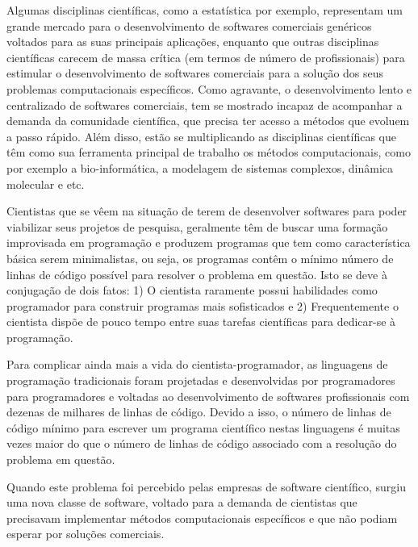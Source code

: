 \documentclass[a4paper,10pt,portuguese]{sphinxmanual}
\begin{document}
Algumas disciplinas científicas, como a estatística por exemplo, representam um grande mercado para o desenvolvimento de softwares comerciais genéricos voltados para as suas principais aplicações, enquanto que outras disciplinas científicas carecem de massa crítica (em termos de número de profissionais) para estimular o desenvolvimento de softwares comerciais para a solução dos seus problemas computacionais específicos. Como agravante, o desenvolvimento lento e centralizado de softwares comerciais, tem se mostrado incapaz de acompanhar a demanda da comunidade científica, que precisa ter acesso a métodos que evoluem a passo rápido. Além disso, estão se multiplicando as disciplinas científicas que têm como sua ferramenta principal de trabalho os métodos computacionais, como por exemplo a bio-informática, a modelagem de sistemas complexos, dinâmica molecular e etc.

Cientistas que se vêem na situação de terem de desenvolver softwares para poder viabilizar seus projetos de pesquisa, geralmente têm de buscar uma formação improvisada em programação e produzem programas que tem como característica básica serem minimalistas, ou seja, os programas contêm o mínimo número de linhas de código possível para resolver o problema em questão. Isto se deve à conjugação de dois fatos: 1) O cientista raramente possui habilidades como programador para construir programas mais sofisticados e 2) Frequentemente o cientista dispõe de pouco tempo entre suas tarefas científicas para dedicar-se à programação.

Para complicar ainda mais a vida do cientista-programador, as linguagens de programação tradicionais foram projetadas e desenvolvidas por programadores para programadores e voltadas ao desenvolvimento de softwares profissionais com dezenas de milhares de linhas de código. Devido a isso, o número de linhas de código mínimo para escrever um programa científico nestas linguagens é muitas vezes maior do que o número de linhas de código associado com a resolução do problema em questão.

Quando este problema foi percebido pelas empresas de software científico, surgiu uma nova classe de software, voltado para a demanda de cientistas que precisavam implementar métodos computacionais específicos e que não podiam esperar por soluções comerciais.
\end{document}
